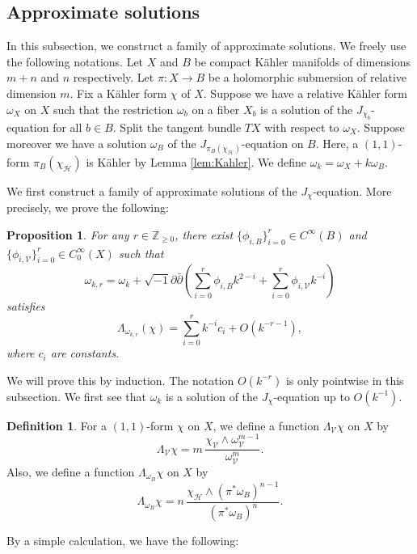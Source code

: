 \documentclass{amsart}
\numberwithin{equation}{section}
\theoremstyle{plain}
\newtheorem{proposition}[equation]{Proposition}
\theoremstyle{definition}
\newtheorem{definition}[equation]{Definition}
\theoremstyle{remark}
\begin{document}
\subsection{Approximate solutions}\label{sec:approximation}
In this subsection, we construct a family of approximate solutions. We freely use the following notations.
Let $X$ and $B$ be compact K{\"a}hler manifolds of dimensions $m+n$ and $n$ respectively.
Let $\pi : X \rightarrow B$ be a holomorphic submersion of relative dimension $m$.
Fix a K{\"a}hler form $\chi$ of $X$. 
Suppose we have a relative K{\"a}hler form $\omega_X$ on $X$ such that the restriction $\omega_b$ on a fiber $X_b$ is a solution of the $J_{\chi_b}$-equation for all $b \in B$.
Split the tangent bundle $TX$ with respect to $\omega_X$.
Suppose moreover we have a solution $\omega_B$ of the $J_{\pi_B(\chi_\mathcal{H})}$-equation on $B$. Here, a $(1,1)$-form $\pi_B(\chi_\mathcal{H})$ is K{\"a}hler by Lemma \ref{lem:Kahler}.
We define $\omega_k = \omega_X + k\omega_B$.

We first construct a family of approximate solutions of the $J_\chi$-equation. More precisely, we prove the following:

\begin{proposition}\label{prop:app}
For any $r\in\mathbb{Z}_{\ge 0}$, 
there exist
$\{ \phi_{i, B} \}_{i=0}^r \in C^\infty (B)$ and 
$ \{ \phi_{i, \mathcal{V}} \}_{i=0}^r \in C_0^\infty \left( X \right)$ 
such that
$$ \omega_{k, r} = \omega_k + \sqrt{-1} \partial \bar{\partial} \left( \sum_{i=0}^r \phi_{i, B} k^{2-i} + \sum_{i=0}^r \phi_{i, \mathcal{V}} k^{-i} \right) $$ satisfies 
$$ \Lambda_{\omega_{k, r}} \left( \chi \right) = \sum_{i=0}^r k^{-i} {c_i} + O \left(k^{-r-1} \right), $$
where $ {c_i} $ are constants.
\end{proposition}
We will prove this by induction. The notation $O \left( k^{-r} \right)$ is only pointwise in this subsection.
We first see that $\omega_k$ is a solution of the $J_\chi$-equation up to $O \left(k^{-1} \right)$.
\begin{definition}
For a $(1,1)$-form $\chi$ on $X$, we define a function $ \Lambda_\mathcal{V} \chi$ on $X$ by
$$ \Lambda_\mathcal{V} \chi  
= m \, \frac{\chi_\mathcal{V} \wedge \omega^{m-1}_\mathcal{V}}{\omega^m_\mathcal{V}}.$$
Also, we define a function $\Lambda_{\omega_B} \chi$ on $X$ by
$$\Lambda_{\omega_B} \chi = n \, \frac{\chi_\mathcal{H} \wedge (\pi^* \omega_B)^{n-1}}{(\pi^* \omega_B)^n}.$$
\end{definition}
By a simple calculation, we have the following:
\end{document}
